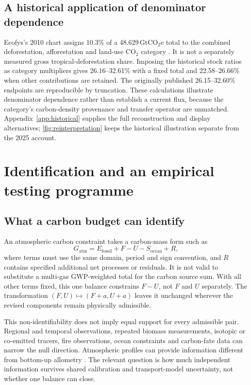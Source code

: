\documentclass[11pt,a4paper]{article}
\newcommand{\COtwo}{\ensuremath{\mathrm{CO}_2}}
\newcommand{\COtwoe}{\ensuremath{\mathrm{CO}_2\mathrm{e}}}
\theoremstyle{remark}
\begin{document}
\subsection{A historical application of denominator dependence}
Ecofys's 2010 chart assigns 10.3\% of a 48.629\,Gt\COtwoe{} total to the combined deforestation, afforestation and land-use \COtwo{} category \citep{Ecofys2013}. It is not a separately measured gross tropical-deforestation share. Imposing the historical stock ratios as category multipliers gives 26.16--32.61\% with a fixed total and 22.58--26.66\% when other contributions are retained. The originally published 26.15--32.60\% endpoints are reproducible by truncation. These calculations illustrate denominator dependence rather than establish a current flux, because the category's carbon-density provenance and transfer operator are unmatched. Appendix~\ref{app:historical} supplies the full reconstruction and display alternatives; \cref{fig:reinterpretation} keeps the historical illustration separate from the 2025 account.

\section{Identification and an empirical testing programme}
\subsection{What a carbon budget can identify}
An atmospheric carbon constraint takes a carbon-mass form such as
\begin{equation}
G_{\mathrm{atm}}=E_{\mathrm{fossil}}+F-U-S_{\mathrm{ocean}}+R,
\label{eq:carbonbudget}
\end{equation}
where terms must use the same domain, period and sign convention, and $R$ contains specified additional net processes or residuals. It is not valid to substitute a multi-gas GWP-weighted total for the carbon source sum. With all other terms fixed, this one balance constrains $F-U$, not $F$ and $U$ separately. The transformation $(F,U)\mapsto(F+a,U+a)$ leaves it unchanged wherever the revised components remain physically admissible.

This non-identifiability does not imply equal support for every admissible pair. Regional and temporal observations, repeated biomass measurements, isotopic or co-emitted tracers, fire observations, ocean constraints and carbon-fate data can narrow the null direction. Atmospheric profiles can provide information different from bottom-up allometry \citep{Gatti2021}. The relevant question is how much independent information survives shared calibration and transport-model uncertainty, not whether one balance can close.
\end{document}

